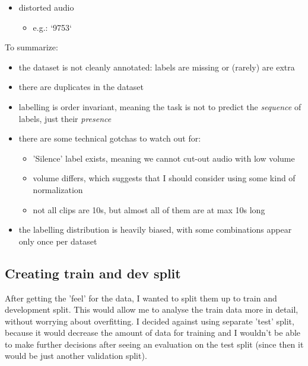 \documentclass[11pt]{article}
\begin{document}
\begin{itemize}
  \item distorted audio
  \begin{itemize}
    \item e.g.: `9753`
  \end{itemize}
\end{itemize}

To summarize:
\begin{itemize}

  \item the dataset is not cleanly annotated: labels are missing or (rarely) are extra

  \item there are duplicates in the dataset

  \item labelling is order invariant, meaning the task is not to predict the
    \emph{sequence} of labels, just their \emph{presence}

  \item there are some technical gotchas to watch out for:
    \begin{itemize}
      \item 'Silence' label exists, meaning we cannot cut-out audio with low volume
      \item volume differs, which suggests that I should consider using some kind of normalization
      \item not all clips are 10s, but almost all of them are at max 10s long
    \end{itemize}

  \item the labelling distribution is heavily biased, with some combinations
    appear only once per dataset

\end{itemize}

\subsection{Creating train and dev split}\label{section:splitting}

After getting the 'feel' for the data, I wanted to split them up to train and
development split. This would allow me to analyse the train data more in
detail, without worrying about overfitting. I decided against using separate
'test' split, because it would decrease the amount of data for training and I
wouldn't be able to make further decisions after seeing an evaluation on the
test split (since then it would be just another validation split).
\end{document}
